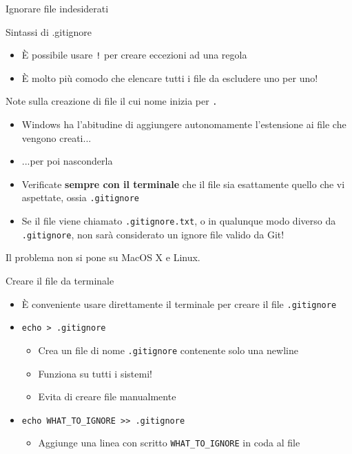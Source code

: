\documentclass[xcolor=dvipsnames,presentation]{beamer}
\begin{document}
\begin{frame}{Ignorare file indesiderati}
\begin{block}{Sintassi di .gitignore}
\begin{itemize}
            \begin{itemize}
                \item È possibile usare \texttt{!} per creare eccezioni ad una regola
                \item È molto più comodo che elencare tutti i file da escludere uno per uno!
            \end{itemize}
        \end{itemize}
    \end{block}
    \begin{block}{Note sulla creazione di file il cui nome inizia per \texttt{.}}
        \begin{itemize}
            \item Windows ha l'abitudine di aggiungere autonomamente l'estensione ai file che
vengono creati...
            \item ...per poi nasconderla
            \item Verificate \textbf{sempre con il terminale} che il file sia esattamente quello che
vi aspettate, ossia \texttt{.gitignore}
            \item Se il file viene chiamato \texttt{.gitignore.txt}, o in qualunque modo diverso da
\texttt{.gitignore}, non sarà considerato un ignore file valido da Git!
        \end{itemize}
        Il problema non si pone su MacOS X e Linux.
    \end{block}
    \begin{block}{Creare il file da terminale}
        \begin{itemize}
            \item È conveniente usare direttamente il terminale per creare il file
\texttt{.gitignore}
            \item \texttt{echo > .gitignore}
            \begin{itemize}
                \item Crea un file di nome \texttt{.gitignore} contenente solo una newline
                \item Funziona su tutti i sistemi!
                \item Evita di creare file manualmente
            \end{itemize}
            \item \texttt{echo WHAT\_TO\_IGNORE >> .gitignore}
            \begin{itemize}
                \item Aggiunge una linea con scritto \texttt{WHAT\_TO\_IGNORE} in coda al file

\end{itemize}
\end{itemize}
\end{block}
\end{frame}
\end{document}
